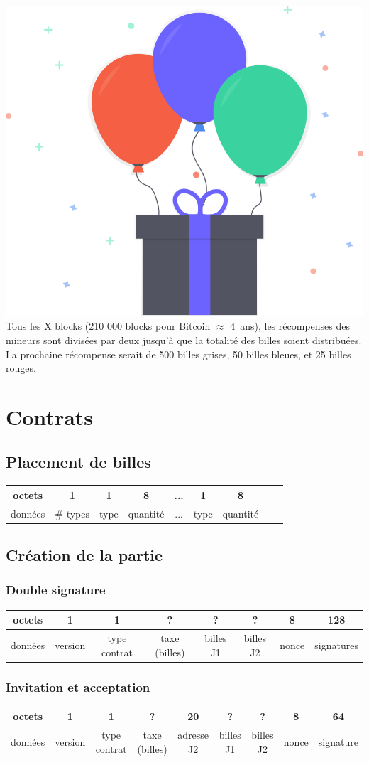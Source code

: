 \documentclass{article}
\begin{document}
\includegraphics[width=0.3\linewidth]{assets/gift.png}\\

Tous les X blocks (210 000 blocks pour Bitcoin $\approx$ 4\ ans), les récompenses des mineurs sont divisées par deux jusqu'à que la totalité des billes soient distribuées.
La prochaine récompense serait de 500 billes grises, 50 billes bleues, et 25 billes rouges.

\section{Contrats}
\subsection*{Placement de billes}
\hspace*{-1cm}%
\begin{tabular}{ |c|c|c|c|c|c|c|c|c| } 
 \hline
octets & 1 & 1 & 8 & ... & 1 & 8\\ 
 \hline
    données & \# types & type & quantité & ... & type & quantité \\ 
 \hline
\end{tabular}
\subsection{Création de la partie}
\subsubsection{Double signature}
\hspace*{-1cm}%
\begin{tabular}{ |c|c|c|c|c|c|c|c|} 
 \hline
 octets & 1 & 1 & ? & ? & ? & 8 & 128\\ 
 \hline
    données & version & type contrat & taxe (billes) & billes J1 & billes J2 & nonce & signatures\\ 
 \hline
\end{tabular}

\subsubsection{Invitation et acceptation}
\hspace*{-1cm}%
\begin{tabular}{ |c|c|c|c|c|c|c|c|c|} 
 \hline
 octets & 1 & 1 & ? & 20 & ? & ? & 8 & 64\\ 
 \hline
    données & version & type contrat & taxe (billes) & adresse J2 & billes J1 & billes J2 & nonce & signature\\ 
 \hline
\end{tabular}\\ \break
\end{document}
